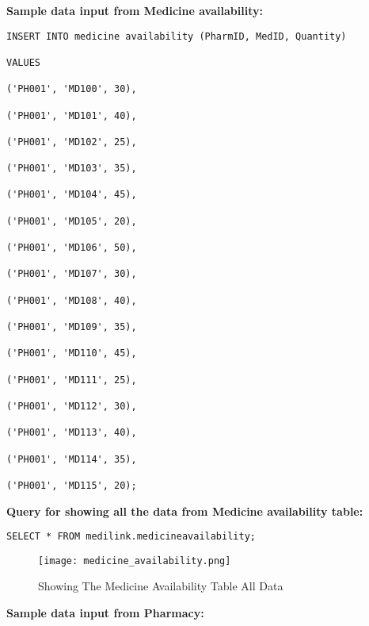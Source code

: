 \documentclass[11pt]{article}
\begin{document}
\textbf{Sample data input from Medicine availability:}
\begin{lstlisting}
INSERT INTO medicine availability (PharmID, MedID, Quantity)

VALUES

('PH001', 'MD100', 30),

('PH001', 'MD101', 40),

('PH001', 'MD102', 25),

('PH001', 'MD103', 35),

('PH001', 'MD104', 45),

('PH001', 'MD105', 20),

('PH001', 'MD106', 50),

('PH001', 'MD107', 30),

('PH001', 'MD108', 40),

('PH001', 'MD109', 35),

('PH001', 'MD110', 45),

('PH001', 'MD111', 25),

('PH001', 'MD112', 30),

('PH001', 'MD113', 40),

('PH001', 'MD114', 35),

('PH001', 'MD115', 20);

\end{lstlisting}

\textbf{Query for showing all the data from Medicine availability table: }
\begin{lstlisting}
SELECT * FROM medilink.medicineavailability;
\end{lstlisting}
\begin{figure}[H]
    \centering
    \texttt{[image: medicine\_availability.png]}
    \caption{Showing The Medicine Availability Table All Data}
    \label{fig:1}
\end{figure}



 \textbf{Sample data input from Pharmacy:}
\end{document}

